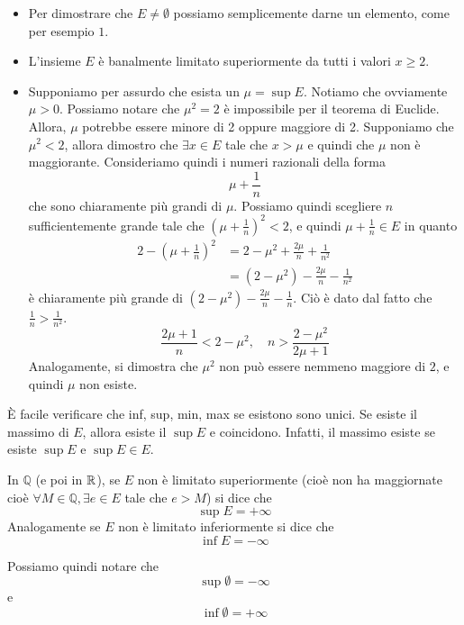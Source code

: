 \documentclass[a4paper]{article}
\begin{document}
\begin{radioactive}
\begin{snippetproof}{}
    \begin{itemize}
        \item Per dimostrare che \(E \neq \emptyset\) possiamo semplicemente darne un elemento, come
        per esempio \(1\).
        \item L'insieme \(E\) è banalmente limitato superiormente
            da tutti i valori \(x \geq 2\). 
        \item Supponiamo per assurdo che esista un \(\mu = \sup E\). Notiamo che ovviamente \(\mu >0\).
        Possiamo notare che \(\mu^2 = 2\) è impossibile per il teorema di Euclide. Allora, \(\mu\)
        potrebbe essere minore di 2 oppure maggiore di 2.
        Supponiamo che \(\mu^2 < 2\), allora dimostro che \(\exists x \in E\) tale che \(x > \mu\)
        e quindi che \(\mu\) non è maggiorante.
        Consideriamo quindi i numeri razionali della forma
        \[
            \mu + \frac{1}{n}
        \]
        che sono chiaramente più grandi di \(\mu\).
        Possiamo quindi scegliere \(n\) sufficientemente grande tale che \({(\mu + \frac{1}{n})}^2 < 2\),
        e quindi \(\mu + \frac{1}{n} \in E\) in quanto
        \begin{align*}
            2 - {\left(\mu + \frac{1}{n}\right)}^2 &= 2 - \mu^2 + \frac{2\mu}{n} + \frac{1}{n^2} \\
            &= (2-\mu^2) - \frac{2\mu}{n} - \frac{1}{n^2}
        \end{align*}
        è chiaramente più grande di \((2-\mu^2) - \frac{2\mu}{n} - \frac{1}{n}\).
        Ciò è dato dal fatto che \(\frac{1}{n} > \frac{1}{n^2}\).
        \[
            \frac{2\mu + 1}{n} < 2-\mu^2, \quad n > \frac{2-\mu^2}{2\mu + 1}
        \]
        Analogamente, si dimostra che \(\mu^2\) non può essere nemmeno maggiore di \(2\),
        e quindi \(\mu\) non esiste.
    \end{itemize}
\end{snippetproof}

\pagebreak

È facile verificare che inf, sup, min, max se esistono sono unici.
Se esiste il massimo di \(E\), allora esiste il \(\sup E\) e coincidono.
Infatti, il massimo esiste se esiste \(\sup E\) e \(\sup E \in E\).

In \(\mathbb{Q}\) (e poi in \(\mathbb{R}\)), se \(E\) non è limitato superiormente (cioè non ha maggiornate
cioè \(\forall M \in \mathbb{Q}, \exists e \in E\) tale che \(e > M\)) si dice che
\[
    \sup E = +\infty
\]
Analogamente se \(E\) non è limitato inferiormente si dice che
\[
    \inf E = -\infty
\]

Possiamo quindi notare che
\[
    \sup \emptyset = -\infty
\]
e
\[
    \inf \emptyset = +\infty
\]
\end{radioactive}
\end{document}
